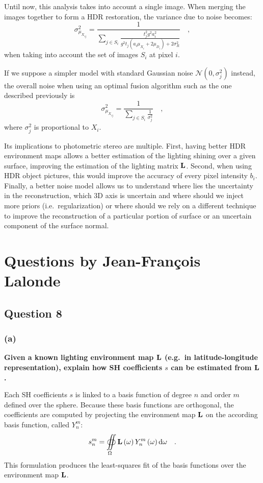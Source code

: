 \documentclass{report}
\begin{document}
Until now, this analysis takes into account a single image. When merging the images together to form a HDR restoration, the variance due to noise becomes:
\begin{equation}
\sigma_{\mu_{X_{ij}}}^2 = \frac{1}{\sum_{j \in S_i} \frac{t_j^2 g^2 a_i^2}{g^2 t_j \left( a_i \mu_{X_i} + 2 \mu_{D_i} \right) + 2 \sigma_R^2}} \quad,
\end{equation}
when taking into account the set of images $S_i$ at pixel $i$.

If we suppose a simpler model with standard Gaussian noise $\mathcal{N}(0,\sigma_j^2)$ instead, the overall noise when using an optimal fusion algorithm such as the one described previously is
\begin{equation}
\sigma_{\mu_{X_{ij}}}^2 = \frac{1}{\sum_{j \in S_i} \frac{1}{\sigma_j^2}}
\quad,
\end{equation}
where $\sigma_j^2$ is proportional to $X_i$.

Its implications to photometric stereo are multiple. First, having better HDR environment maps allows a better estimation of the lighting shining over a given surface, improving the estimation of the lighting matrix $\mathbf{L}$. Second, when using HDR object pictures, this would improve the accuracy of every pixel intensity $b_i$. Finally, a better noise model allows us to understand where lies the uncertainty in the reconstruction, which 3D axis is uncertain and where should we inject more priors (i.e.\ regularization) or where should we rely on a different technique to improve the reconstruction of a particular portion of surface or an uncertain component of the surface normal.

\chapter{Questions by Jean-François Lalonde}

\section{Question 8}
\subsection{(a)}
\textbf{Given a known lighting environment map $\mathbf{L}$ (e.g.\ in latitude-longitude representation), explain how SH coefficients $s$ can be estimated from $\mathbf{L}$.}

Each SH coefficients $s$ is linked to a basis function of degree $n$ and order $m$ defined over the sphere. Because these basis functions are orthogonal, the coefficients are computed by projecting the environment map $\mathbf{L}$ on the according basis function, called $Y_n^m$:
\begin{equation}
s_n^m = \oiint\limits_{\Omega} \mathbf{L}\left(\mathbf{\omega} \right) Y_n^m \left( \mathbf{\omega} \right) \mathrm{d} \mathbf{\omega}   \quad.
\end{equation}
This formulation produces the least-squares fit of the basis functions over the environment map $\mathbf{L}$.
\end{document}
